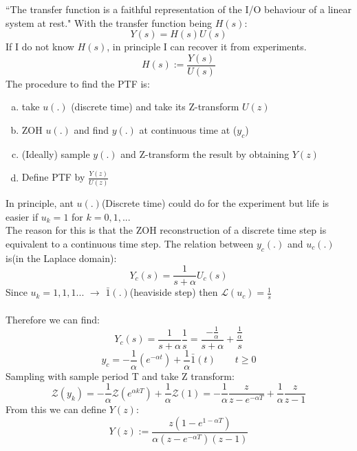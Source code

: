 \documentclass[a4paper,11pt]{article}
\begin{document}
	``The transfer function is a faithful representation of the I/O behaviour of a linear system at rest."
	With the transfer function being $H(s)$: 
	\begin{equation}
		Y(s)=H(s)U(s)
	\end{equation}
	If I do not know $H(s)$, in principle I can recover it from experiments.
	\begin{equation}
		H(s):=\frac{Y(s)}{U(s)}
	\end{equation}
	The procedure to find the PTF is:
	\begin{enumerate}[a)]
		\item take $u(.)$ (discrete time) and take its Z-transform $U(z)$
		\item ZOH $u(.)$ and find $y(.)$ at continuous time at ($y_c$) 
		\item (Ideally) sample $y(.)$ and Z-transform the result by obtaining $Y(z)$
		\item Define PTF by $\frac{Y(z)}{U(z)}$
	\end{enumerate}
	In principle, ant $u(.)$(Discrete time) could do for the experiment but life is easier if $u_k=1$ for $k=0,1,...$\\
	The reason for this is that the ZOH reconstruction of a discrete time step is equivalent to a continuous time step.
	The relation between $y_c(.)$ and $u_c(.)$ is(in the Laplace domain):
	\begin{equation}
		Y_c(s)=\frac{1}{s+\alpha}U_c(s)
	\end{equation}  
	Since ${u_k}={1,1,1...}$ $\rightarrow$ $\bar1(.)$(heaviside step) then $\mathcal{L}(u_c)=\frac{1}{s}$\\\\
	Therefore we can find:
	\begin{equation}
		Y_c(s)=\frac{1}{s+\alpha}\frac{1}{s}=\frac{-\frac{1}{\alpha}}		{s+\alpha}+\frac{\frac{1}{\alpha}}{s}
	\end{equation}
	\begin{equation}
		y_c = -\frac{1}{\alpha}(e^{-\alpha t})+\frac{1}{\alpha}\bar1(t) \qquad t\geq 0
	\end{equation}
	Sampling with sample period T and take Z transform:
	\begin{equation}
		\mathcal{Z}(y_k)=-\frac{1}{\alpha}\mathcal{Z}(e^{\alpha kT})+\frac{1}{\alpha}\mathcal{Z}(1)=-\frac{1}{\alpha}\frac{z}{z-e^{-\alpha T}}+\frac{1}{\alpha}\frac{z}{z-1}
	\end{equation}
	From this we can define $Y(z)$:
	\begin{equation}
		Y(z) := \frac{z(1-e^{1-\alpha T})}{\alpha (z-e^{-\alpha T})(z-1)}
	\end{equation}			
\end{document}
